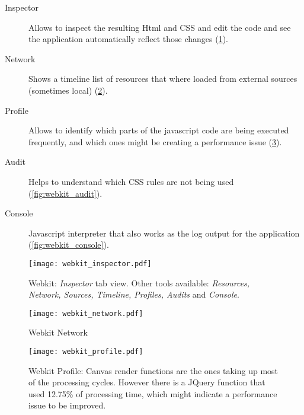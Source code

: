       \begin{description}
        \item[Inspector] Allows to inspect the resulting Html and CSS and edit the code and see the application automatically reflect those changes (\ref{fig:webkit_inspector}).
        \item[Network] Shows a timeline list of resources that where loaded from external sources (sometimes local) (\ref{fig:webkit_network}).
        \item[Profile] Allows to identify which parts of the javascript code are being executed frequently, and which ones might be creating a performance issue (\ref{fig:webkit_profile}).
        \item[Audit] Helps to understand which CSS rules are not being used (\ref{fig:webkit_audit}).
        \item[Console] Javascript interpreter that also works as the log output for the application (\ref{fig:webkit_console}).
      \end{description}

      \begin{figure}[ht]
        \begin{center}
          \texttt{[image: webkit\_inspector.pdf]}
        \end{center}
        \caption{Webkit: \emph{Inspector} tab view. Other tools available: \emph{Resources, Network, Sources, Timeline, Profiles, Audits} and \emph{Console}.}
        \label{fig:webkit_inspector}
      \end{figure}

      \begin{figure}[ht]
        \begin{center}
          \texttt{[image: webkit\_network.pdf]}
        \end{center}
        \caption{Webkit Network}
        \label{fig:webkit_network}
      \end{figure}

      \begin{figure}[ht]
        \begin{center}
          \texttt{[image: webkit\_profile.pdf]}
        \end{center}
        \caption{Webkit Profile: Canvas render functions are the ones taking up most of the processing cycles. However there is a JQuery function that used 12.75\% of processing time, which might indicate a performance issue to be improved.}
        \label{fig:webkit_profile}
      \end{figure}

